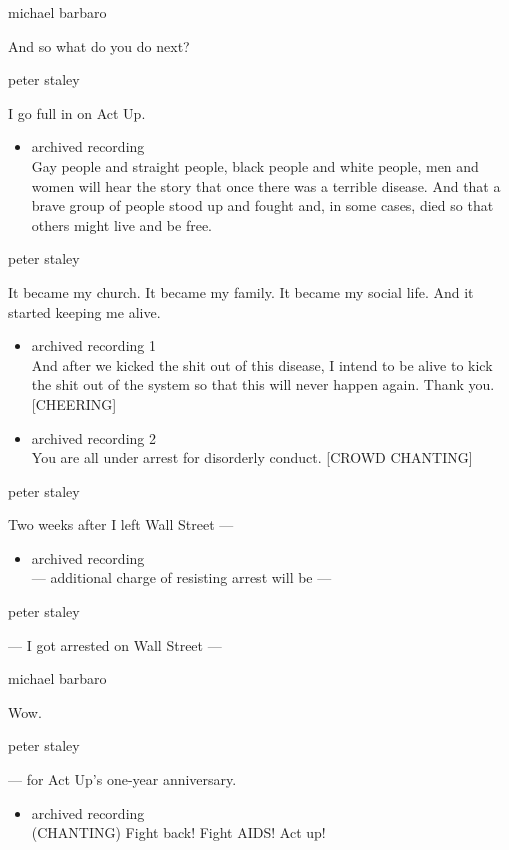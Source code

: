 michael barbaro

And so what do you do next?

peter staley

I go full in on Act Up.

\begin{itemize}
\tightlist
\item
  archived recording\\
  Gay people and straight people, black people and white people, men and
  women will hear the story that once there was a terrible disease. And
  that a brave group of people stood up and fought and, in some cases,
  died so that others might live and be free.
\end{itemize}

peter staley

It became my church. It became my family. It became my social life. And
it started keeping me alive.

\begin{itemize}
\item
  archived recording 1\\
  And after we kicked the shit out of this disease, I intend to be alive
  to kick the shit out of the system so that this will never happen
  again. Thank you. {[}CHEERING{]}
\item
  archived recording 2\\
  You are all under arrest for disorderly conduct. {[}CROWD CHANTING{]}
\end{itemize}

peter staley

Two weeks after I left Wall Street ---

\begin{itemize}
\tightlist
\item
  archived recording\\
  --- additional charge of resisting arrest will be ---
\end{itemize}

peter staley

--- I got arrested on Wall Street ---

michael barbaro

Wow.

peter staley

--- for Act Up's one-year anniversary.

\begin{itemize}
\tightlist
\item
  archived recording\\
  (CHANTING) Fight back! Fight AIDS! Act up!
\end{itemize}

